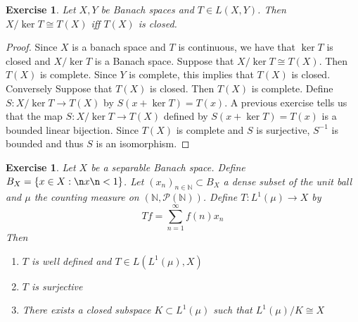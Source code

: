 \documentclass[12pt]{amsart}
\newtheorem{ex}[thm]{Exercise}
\newcommand{\N}{\mathbb{N}}
\newcommand{\MP}{\mathcal{P}}
\begin{document}
\begin{ex}
	Let $X, Y$ be Banach spaces and $T \in L(X,Y)$. Then $X/\ker T \cong T(X)$ iff $T(X)$ is closed.
\end{ex}

\begin{proof}
	Since $X$ is a banach space and $T$ is continuous, we have that $\ker T$ is closed and $X/ \ker T$ is a Banach space. Suppose that $X/ \ker T \cong T(X)$. Then $T(X)$ is complete. Since $Y$ is complete, this implies that $T(X)$ is closed. \\
	Conversely Suppose that $T(X)$ is closed. Then $T(X)$ is complete. Define $S: X/ \ker T \rightarrow T(X)$ by $S(x + \ker T) = T(x)$. A previous exercise tells us that the map $S: X/ \ker T \rightarrow T(X)$ defined by $S(x + \ker T) = T(x)$ is a bounded linear bijection. Since $T(X)$ is complete and $S$ is surjective, $S^{-1}$ is bounded and thus $S$ is an isomorphism.   
\end{proof}

\begin{ex}
	Let $X$ be a separable Banach space. Define $B_X = \{x \in X: \n x \n < 1\}$. Let $(x_n)_{n \in \N} \subset B_X $ a dense subset of the unit ball and $\mu$ the counting measure on $(\N, \MP(\N))$. Define $T: L^1(\mu) \rightarrow X$ by $$Tf = \sum_{n=1}^{\infty}f(n)x_n$$ Then 
	\begin{enumerate}
		\item $T$ is well defined and $T \in L(L^1(\mu), X)$
		\item $T$ is surjective
		\item There exists a closed subspace $K \subset L^1(\mu)$ such that $L^1(\mu)/K \cong X$ 
	\end{enumerate} 
\end{ex}
\end{document}
